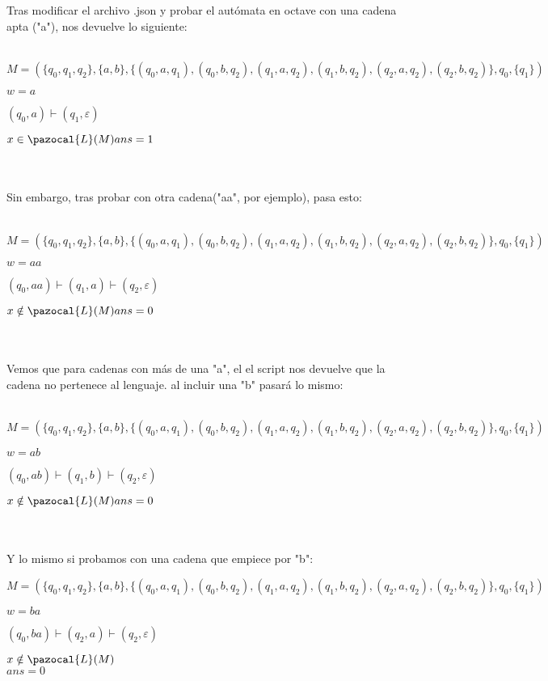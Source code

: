\documentclass[fleqn, 10pt]{article}
\newcommand{\Lb}{\pazocal{L}}
\theoremstyle{plain}
\theoremstyle{definition}
\begin{document}
Tras modificar el archivo .json y probar el autómata en octave con una cadena apta ("a"), nos devuelve lo siguiente:\\
\\
\begin{ceqn}	%
$M = (\{q_0, q_1, q_2\}, \{a, b\}, \{(q_0, a, q_1), (q_0, b, q_2), (q_1, a, q_2), (q_1, b, q_2), (q_2, a, q_2), (q_2, b, q_2)\}, q_0, \{q_1\})$

$w = a$

$(q_0, a) \vdash (q_1, \varepsilon)$

$x \in \Lb(M)\\
ans = 1
$\end{ceqn} 
\\
\\
Sin embargo, tras probar con otra cadena("aa", por ejemplo), pasa esto:
\\
\\
\begin{ceqn}	%
$M = (\{q_0, q_1, q_2\}, \{a, b\}, \{(q_0, a, q_1), (q_0, b, q_2), (q_1, a, q_2), (q_1, b, q_2), (q_2, a, q_2), (q_2, b, q_2)\}, q_0, \{q_1\})$

$w = aa$

$(q_0, aa) \vdash (q_1, a) \vdash (q_2, \varepsilon)$

$x \notin \Lb(M)\\
ans = 0
$\end{ceqn} 
\\
\\
Vemos que para cadenas con más de una "a", el el script nos devuelve que la cadena no pertenece al lenguaje. al incluir una "b" pasará lo mismo:
\\
\\
\begin{ceqn}
$M = (\{q_0, q_1, q_2\}, \{a, b\}, \{(q_0, a, q_1), (q_0, b, q_2), (q_1, a, q_2), (q_1, b, q_2), (q_2, a, q_2), (q_2, b, q_2)\}, q_0, \{q_1\})$

$w = ab$

$(q_0, ab) \vdash (q_1, b) \vdash (q_2, \varepsilon)$

$x \notin \Lb(M) \\
ans = 0
$\end{ceqn} 
\\
\\ Y lo mismo si probamos con una cadena que empiece por "b":
\\

\begin{ceqn}
$M = (\{q_0, q_1, q_2\}, \{a, b\}, \{(q_0, a, q_1), (q_0, b, q_2), (q_1, a, q_2), (q_1, b, q_2), (q_2, a, q_2), (q_2, b, q_2)\}, q_0, \{q_1\})$

$w = ba$

$(q_0, ba) \vdash (q_2, a) \vdash (q_2, \varepsilon)$

$x \notin \Lb(M)$ \\
$ans = 0$
\end{ceqn} 
\end{document}
